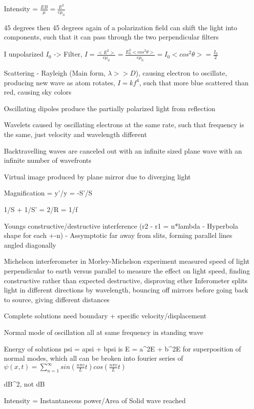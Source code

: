 \documentclass[11 pt, twoside]{article}
\begin{document}
Intensity = $\frac{EB}{\mu} = \frac{E^2}{c\mu_0}$

45 degrees then 45 degrees again of a polarization field can shift the light into components, such that it can pass through the two perpendicular filters

I unpolarized $I_0$ -> Filter, $I = \frac{<E^2>}{c\mu_0} = \frac{E_0^2<cos^2\theta>}{c\mu_0} = I_0<cos^2\theta> = \frac{I_0}{2}$

Scattering - Rayleigh (Main form, $\lambda >> D$), causing electron to oscillate, producing new wave as atom rotates, $I = kf^4$, such that more blue scattered than red, causing sky colors

Oscillating dipoles produce the partially polarized light from reflection

Wavelets caused by oscillating electrons at the same rate, such that frequency is the same, just velocity and wavelength different

Backtravelling waves are canceled out with an infinite sized plane wave with an infinite number of wavefronts

Virtual image produced by plane mirror due to diverging light

Magnification = y'/y = -S'/S

1/S + 1/S' = 2/R = 1/f

Youngs constructive/destructive interference (r2 - r1 = n*lambda - Hyperbola shape for each +-n) - Assymptotic far away from slits, forming parallel lines angled diagonally

Michelson interferometer in Morley-Michelson experiment measured speed of light perpendicular to earth versus parallel to measure the effect on light speed, finding constructive rather than expected destructive, disproving ether
Inferometer splits light in different directions by wavelength, bouncing off mirrors before going back to source, giving different distances

Complete solutions need boundary + specific velocity/displacement

Normal mode of oscillation all at same frequency in standing wave

Energy of solutions psi = apsi + bpsi is E = a^2E + b^2E for superposition of normal modes, which all can be broken into fourier series of
$\psi(x, t) = \sum_{n=1}^{\infty} sin(\frac{n\pi v}{L}t)cos(\frac{n\pi v}{L}t)$

dB^2, not dB

Intensity = Instantaneous power/Area of Solid wave reached
\end{document}
